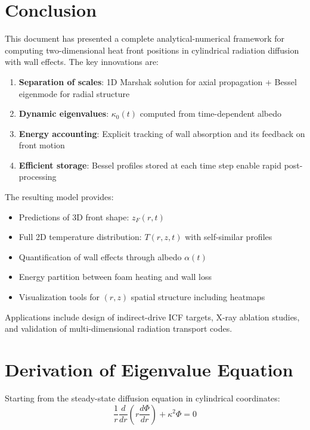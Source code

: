 \documentclass[12pt,a4paper]{article}
\begin{document}
\section{Conclusion}

This document has presented a complete analytical-numerical framework for computing two-dimensional heat front positions in cylindrical radiation diffusion with wall effects. The key innovations are:

\begin{enumerate}
    \item \textbf{Separation of scales}: 1D Marshak solution for axial propagation + Bessel eigenmode for radial structure
    \item \textbf{Dynamic eigenvalues}: $\kappa_0(t)$ computed from time-dependent albedo
    \item \textbf{Energy accounting}: Explicit tracking of wall absorption and its feedback on front motion
    \item \textbf{Efficient storage}: Bessel profiles stored at each time step enable rapid post-processing
\end{enumerate}

The resulting model provides:
\begin{itemize}
    \item Predictions of 3D front shape: $z_F(r,t)$
    \item Full 2D temperature distribution: $T(r,z,t)$ with self-similar profiles
    \item Quantification of wall effects through albedo $\alpha(t)$
    \item Energy partition between foam heating and wall loss
    \item Visualization tools for $(r,z)$ spatial structure including heatmaps
\end{itemize}

Applications include design of indirect-drive ICF targets, X-ray ablation studies, and validation of multi-dimensional radiation transport codes.

\appendix

\section{Derivation of Eigenvalue Equation}

Starting from the steady-state diffusion equation in cylindrical coordinates:
\begin{equation}
\frac{1}{r}\frac{d}{dr}\left(r\frac{d\Phi}{dr}\right) + \kappa^2 \Phi = 0
\end{equation}
\end{document}
